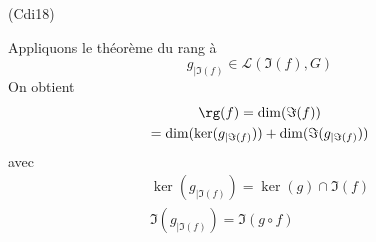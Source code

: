 \begin{tiny}(Cdi18)\end{tiny} Appliquons le théorème du rang à
\begin{displaymath}
  g_{|\Im(f)} \in \mathcal{L}(\Im(f),G)
\end{displaymath}
On obtient
\begin{multline*}
  \rg(f) = \dim(\Im(f)) \\
  = \dim(\ker(g_{|\Im(f)})) + \dim(\Im(g_{|\Im(f)})) 
\end{multline*}
avec
\begin{multline*}
  \ker(g_{|\Im(f)}) = \ker(g) \cap \Im(f) \\ 
  \Im(g_{|\Im(f)}) = \Im(g\circ f)
\end{multline*}

